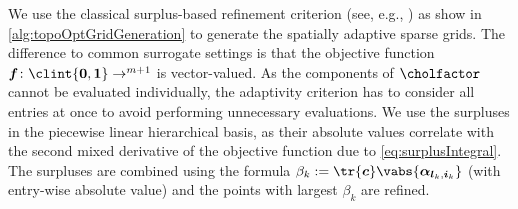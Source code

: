 We use the classical surplus-based refinement criterion
(see, e.g., \cite{Pflueger10Spatially})
as show in \cref{alg:topoOptGridGeneration}
to generate the spatially adaptive sparse grids.
The difference to common surrogate settings is that the objective function
$\*f\colon \clint{\*0, \*1} \to \real^{m+1}$ is vector-valued.
As the components of $\cholfactor$ cannot be evaluated individually,
the adaptivity criterion has to consider all entries at once
to avoid performing unnecessary evaluations.
We use the surpluses in the piecewise linear hierarchical basis,
as their absolute values correlate with the second mixed derivative
of the objective function due to \cref{eq:surplusIntegral}.
The surpluses are combined using the formula
$\beta_k := \tr{\*c} \vabs{\vsurplus_{\*l_k,\*i_k}}$
(with entry-wise absolute value) and the
points with largest $\beta_k$ are refined.

